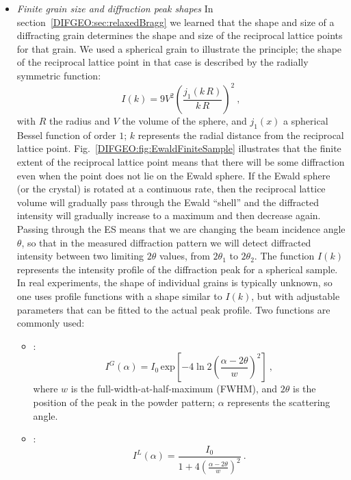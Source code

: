 \begin{itemize}
\item \textit{Finite grain size and diffraction peak shapes}\label{\chabbr:ssec:peakshapes}
In section~\ref{DIFGEO:sec:relaxedBragg} we learned that the shape and size of a diffracting grain determines the shape and size of the reciprocal lattice points for that grain.  We used a spherical grain to illustrate the principle; the shape of the reciprocal lattice point in that case is described by the radially symmetric function:
\[
	I(k) = 9V^2 \left(\frac{j_1(k\,R)}{k\,R}\right)^2\ ,
\]
with $R$ the radius and $V$ the volume of the sphere, and $j_1(x)$ a spherical Bessel function of order $1$; $k$ represents the radial distance from the reciprocal lattice point.  Fig.~\ref{DIFGEO:fig:EwaldFiniteSample} illustrates that the finite extent of the reciprocal lattice point means that there will be some diffraction even when the point does not lie on the Ewald sphere. If the Ewald sphere (or the crystal) is rotated at a continuous rate, then the reciprocal lattice volume will gradually pass through the Ewald ``shell'' and the diffracted intensity will gradually increase to a maximum and then decrease again.  Passing through the ES means that we are changing the beam incidence angle $\theta$, so that in the measured diffraction pattern we will detect diffracted intensity between two limiting $2\theta$ values, from $2\theta_1$ to $2\theta_2$.  The function $I(k)$ represents the intensity profile of the diffraction peak for a spherical sample.  In real experiments, the shape of individual grains is typically unknown, so one uses profile functions with a shape similar to $I(k)$, but with adjustable parameters that can be fitted to the actual peak profile. Two functions are commonly used:
\begin{itemize}
	\item {}: 
	\begin{equation}
		I^G(\alpha) = I_0\, \text{exp}\left[ -4\ln 2\left(\frac{\alpha-2\theta}{w}\right)^2\right]\ ,\label{\chabbr:eq:Gaussianpeak}
	\end{equation}
	where $w$ is the full-width-at-half-maximum (FWHM), and $2\theta$ is the position of the peak in the powder pattern; $\alpha$ represents the scattering angle.
	\item {}: 
	\begin{equation}
		I^L(\alpha) = \frac{I_0}{1+4\left(\frac{\alpha-2\theta}{w}\right)^2}\ .\label{\chabbr:eq:Lorentzianpeak}
	\end{equation}
\end{itemize}

\end{itemize}
